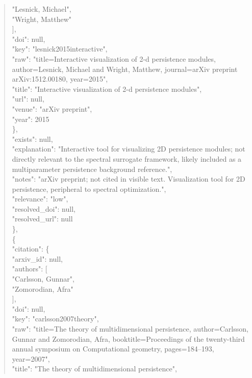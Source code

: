 \documentclass[11pt]{article}
\begin{document}
\begin{quote}
          "Lesnick, Michael",\\
          "Wright, Matthew"\\
        ],\\
        "doi": null,\\
        "key": "lesnick2015interactive",\\
        "raw": "title=Interactive visualization of 2-d persistence modules, author=Lesnick, Michael and Wright, Matthew, journal=arXiv preprint arXiv:1512.00180, year=2015",\\
        "title": "Interactive visualization of 2-d persistence modules",\\
        "url": null,\\
        "venue": "arXiv preprint",\\
        "year": 2015\\
      \},\\
      "exists": null,\\
      "explanation": "Interactive tool for visualizing 2D persistence modules; not directly relevant to the spectral surrogate framework, likely included as a multiparameter persistence background reference.",\\
      "notes": "arXiv preprint; not cited in visible text. Visualization tool for 2D persistence, peripheral to spectral optimization.",\\
      "relevance": "low",\\
      "resolved\_doi": null,\\
      "resolved\_url": null\\
    \},\\
    \{\\
      "citation": \{\\
        "arxiv\_id": null,\\
        "authors": [\\
          "Carlsson, Gunnar",\\
          "Zomorodian, Afra"\\
        ],\\
        "doi": null,\\
        "key": "carlsson2007theory",\\
        "raw": "title=The theory of multidimensional persistence, author=Carlsson, Gunnar and Zomorodian, Afra, booktitle=Proceedings of the twenty-third annual symposium on Computational geometry, pages=184--193, year=2007",\\
        "title": "The theory of multidimensional persistence",\\

\end{quote}
\end{document}
